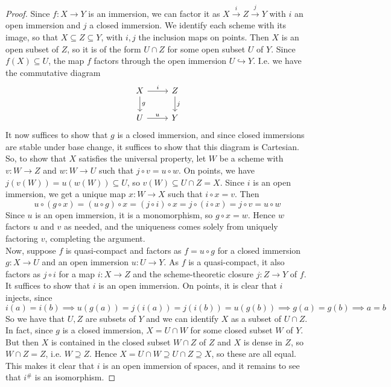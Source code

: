 \begin{proof}
	Since $f : X \to Y$ is an immersion, we can factor it as $X \xrightarrow{i} Z \xrightarrow{j} Y$ with $i$ an open immersion and $j$ a closed immersion. We identify each scheme with its image, so that $X \subseteq Z \subseteq Y$, with $i,j$ the inclusion maps on points. Then $X$ is an open subset of $Z$, so it is of the form $U \cap Z$ for some open subset $U$ of $Y$. Since $f(X) \subseteq U$, the map $f$ factors through the open immersion $U \hookrightarrow Y$. I.e. we have the commutative diagram
	\[ \begin{tikzcd} X \arrow[r,"i"] \arrow[d,"g"] & Z \arrow[d,"j"] \\ U \arrow[r,"u"] & Y \end{tikzcd} \]
	It now suffices to show that $g$ is a closed immersion, and since closed immersions are stable under base change, it suffices to show that this diagram is Cartesian. So, to show that $X$ satisfies the universal property, let $W$ be a scheme with $v : W \to Z$ and $w : W \to U$ such that $j \circ v = u \circ w$. On points, we have $j(v(W)) = u(w(W)) \subseteq U$, so $v(W) \subseteq U \cap Z = X$. Since $i$ is an open immersion, we get a unique map $x : W \to X$ such that $i \circ x = v$. Then
	\[ u \circ (g \circ x) = (u \circ g) \circ x = (j \circ i) \circ x = j \circ (i \circ x) = j \circ v = u \circ w \]
	Since $u$ is an open immersion, it is a monomorphism, so $g \circ x = w$. Hence $w$ factors $u$ and $v$ as needed, and the uniqueness comes solely from uniquely factoring $v$, completing the argument. \\
	
	Now, suppose $f$ is quasi-compact and factors as $f = u \circ g$ for a closed immersion $g : X \to U$ and an open immersion $u : U \to Y$. As $f$ is a quasi-compact, it also factors as $j \circ i$ for a map $i : X \to Z$ and the scheme-theoretic closure $j : Z \to Y$ of $f$. It suffices to show that $i$ is an open immersion. On points, it is clear that $i$ injects, since
	\[ i(a) = i(b) \implies u(g(a)) = j(i(a)) = j(i(b)) = u(g(b)) \implies g(a) = g(b) \implies a = b \]
	So we have that $U,Z$ are subsets of $Y$ and we can identify $X$ as a subset of $U \cap Z$. In fact, since $g$ is a closed immersion, $X = U \cap W$ for some closed subset $W$ of $Y$. But then $X$ is contained in the closed subset $W \cap Z$ of $Z$ and $X$ is dense in $Z$, so $W \cap Z = Z$, i.e. $W \supseteq Z$. Hence $X = U \cap W \supseteq U \cap Z \supseteq X$, so these are all equal. This makes it clear that $i$ is an open immersion of spaces, and it remains to see that $i^\#$ is an isomorphism.
	

\end{proof}

